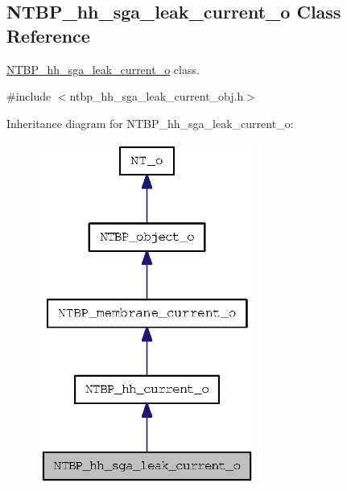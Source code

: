 \subsection{NTBP\_\-hh\_\-sga\_\-leak\_\-current\_\-o Class Reference}
\label{class_n_t_b_p__hh__sga__leak__current__o}


\hyperlink{class_n_t_b_p__hh__sga__leak__current__o}{NTBP\_\-hh\_\-sga\_\-leak\_\-current\_\-o} class.  




{\ttfamily \#include $<$ntbp\_\-hh\_\-sga\_\-leak\_\-current\_\-obj.h$>$}



Inheritance diagram for NTBP\_\-hh\_\-sga\_\-leak\_\-current\_\-o:
\nopagebreak
\begin{figure}[H]
\begin{center}
\leavevmode
\includegraphics[width=202pt]{class_n_t_b_p__hh__sga__leak__current__o__inherit__graph}
\end{center}
\end{figure}


